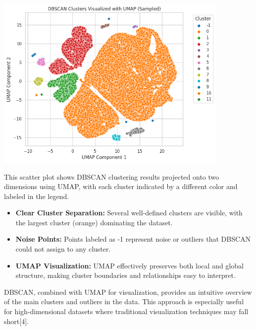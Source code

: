 \documentclass[a4paper]{article}
\begin{document}
\begin{multicols}{2}
\vspace{1em}

\noindent
\begin{minipage}{\columnwidth}
\centering
\includegraphics[width=0.85\textwidth]{DBSCAN Clusters Visualized with UMAP (Sampled).png}
\label{fig:dbscan_umap}
\end{minipage}

This scatter plot shows DBSCAN clustering results projected onto two dimensions using UMAP, with each cluster indicated by a different color and labeled in the legend.

\begin{itemize}
    \item \textbf{Clear Cluster Separation:} Several well-defined clusters are visible, with the largest cluster (orange) dominating the dataset.
    \item \textbf{Noise Points:} Points labeled as -1 represent noise or outliers that DBSCAN could not assign to any cluster.
    \item \textbf{UMAP Visualization:} UMAP effectively preserves both local and global structure, making cluster boundaries and relationships easy to interpret.
\end{itemize}

DBSCAN, combined with UMAP for visualization, provides an intuitive overview of the main clusters and outliers in the data. This approach is especially useful for high-dimensional datasets where traditional visualization techniques may fall short[4].



\end{multicols}
\end{document}
